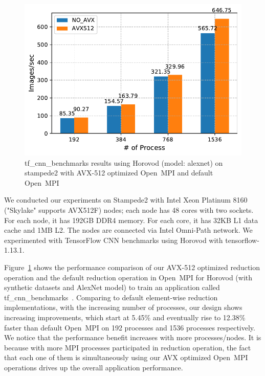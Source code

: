 \documentclass[5p,times,twocolumn]{elsarticle}
\newcommand{\ompi}[0]{Open~MPI\xspace}
\begin{document}
\begin{figure}[h]
    \centering
    \includegraphics[width=\linewidth]{horovod_tacc.pdf}
    \caption{tf\_cnn\_benchmarks results using Horovod (model: alexnet) on stampede2
    with AVX-512 optimized \ompi and default \ompi}
    \label{fig:horovodtacc}
\end{figure}

We conducted our experiments on Stampede2 with Intel Xeon Platinum 8160 ("Skylake" supports AVX512F) nodes; each node has 48 cores with two sockets. For each node, it has 192GB DDR4 memory. For each core, it has 32KB L1 data cache and 1MB L2. The nodes are connected via Intel Omni-Path network.
We experimented with TensorFlow CNN benchmarks using Horovod with tensorflow-1.13.1.

Figure~\ref{fig:horovodtacc} shows the performance comparison of
our AVX-512 optimized reduction operation and the default reduction operation in \ompi for Horovod (with synthetic datasets and AlexNet model) to train an application called tf\_cnn\_benchmarks~\cite{cnnTensorflow}.
Comparing to default element-wise reduction
implementations, with the increasing number of processes,
our design shows increasing improvements, which start at 5.45\% and
eventually rise to 12.38\% faster than default \ompi on 192 processes and 1536 processes respectively.
We notice that the performance benefit increases with more processes/nodes.
It is because with more MPI processes participated in reduction operation,
the fact that each one of them is simultaneously using our AVX optimized \ompi
operations drives up the overall application performance.
\end{document}
